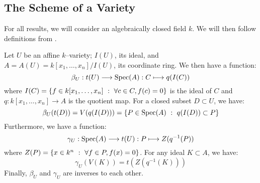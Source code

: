 
\subsection{The Scheme of a Variety}

For all results, we will consider an algebraically closed field
$k$. We will then follow definitions from \cite{HartAG}.

\begin{lem}\label{lem:affine-var-to-scheme}
Let $U$ be an affine $k$--variety; $I(U)$, its ideal, and
$A = A(U) = k[x_1, \dots, x_n]/I(U)$,
its coordinate ring. We then have a function:
\[
\beta_U : t(U) \to \Spec(A)
        : C \mapsto q(I(C))
\]
where $I(C) = \set[f \in {k[x_1, \dots, x_n]}]{\forall c \in C, f(c) = 0}$ is
the ideal of $C$ and $q : k[x_1, \dots, x_n] \to A$ is the quotient map.
For a closed subset $D \subset U$, we have:
\[
\beta_U(t(D)) = V(q(I(D))) = \set[P \in \Spec(A)]{q(I(D)) \subset P}
\]
Furthermore, we have a function:
\[
\gamma_U : \Spec(A) \to t(U) : P \mapsto Z(q^{-1}(P))
\]
where $Z(P) = \set[x \in k^n]{\forall f \in P, f(x) = 0}$.
For any ideal $K \subset A$, we have:
\[
\gamma_U(V(K)) = t(Z(q^{-1}(K)))
\]
Finally, $\beta_U$ and $\gamma_U$ are inverses to each other.
\end{lem}
